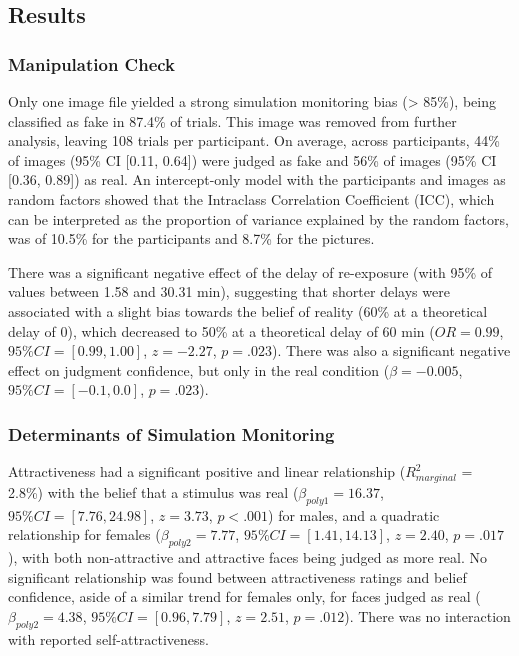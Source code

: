 \documentclass[
  man,floatsintext]{apa6}
\begin{document}
\hypertarget{results}{%
\subsection{Results}\label{results}}

\hypertarget{manipulation-check}{%
\subsubsection{Manipulation Check}\label{manipulation-check}}

Only one image file yielded a strong simulation monitoring bias (\textgreater{} 85\%), being classified as fake in 87.4\% of trials. This image was removed from further analysis, leaving 108 trials per participant. On average, across participants, 44\% of images (95\% CI {[}0.11, 0.64{]}) were judged as fake and 56\% of images (95\% CI {[}0.36, 0.89{]}) as real. An intercept-only model with the participants and images as random factors showed that the Intraclass Correlation Coefficient (ICC), which can be interpreted as the proportion of variance explained by the random factors, was of 10.5\% for the participants and 8.7\% for the pictures.

There was a significant negative effect of the delay of re-exposure (with 95\% of values between 1.58 and 30.31 min), suggesting that shorter delays were associated with a slight bias towards the belief of reality (60\% at a theoretical delay of 0), which decreased to 50\% at a theoretical delay of 60 min (\(OR = 0.99\), \(95\% CI = [0.99, 1.00]\), \(z = -2.27\), \(p = .023\)). There was also a significant negative effect on judgment confidence, but only in the real condition (\(\beta = -0.005\), \(95\% CI = [-0.1, 0.0]\), \(p = .023\)).

\hypertarget{determinants-of-simulation-monitoring}{%
\subsubsection{Determinants of Simulation Monitoring}\label{determinants-of-simulation-monitoring}}

Attractiveness had a significant positive and linear relationship (\(R^2_{marginal}\) = 2.8\%) with the belief that a stimulus was real (\(\beta_{poly1} = 16.37\), \(95\% CI = [7.76, 24.98]\), \(z = 3.73\), \(p < .001\)) for males, and a quadratic relationship for females (\(\beta_{poly2} = 7.77\), \(95\% CI = [1.41, 14.13]\), \(z = 2.40\), \(p = .017\)), with both non-attractive and attractive faces being judged as more real. No significant relationship was found between attractiveness ratings and belief confidence, aside of a similar trend for females only, for faces judged as real (\(\beta_{poly2} = 4.38\), \(95\% CI = [0.96, 7.79]\), \(z = 2.51\), \(p = .012\)). There was no interaction with reported self-attractiveness.
\end{document}
